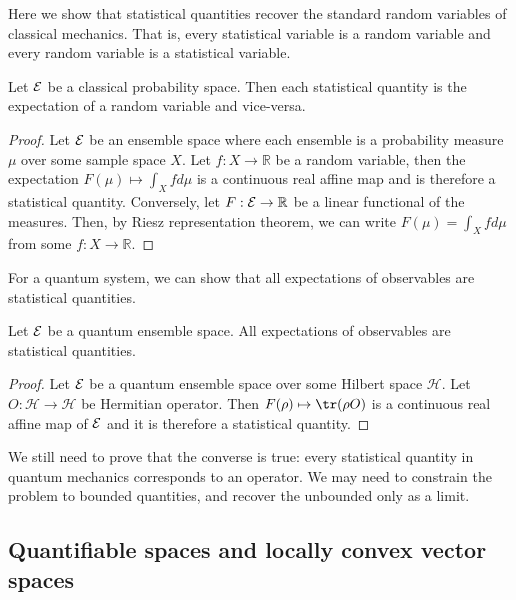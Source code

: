 Here we show that statistical quantities recover the standard random variables of classical mechanics. That is, every statistical variable is a random variable and every random variable is a statistical variable.

\begin{mathSection}
\begin{prop}
	Let $\mathcal{E}$ be a classical probability space. Then each statistical quantity is the expectation of a random variable and vice-versa.
\end{prop}

\begin{proof}
	Let $\mathcal{E}$ be an ensemble space where each ensemble is a probability measure $\mu$ over some sample space $X$. Let $f : X \to \mathbb{R}$ be a random variable, then the expectation $F(\mu) \mapsto \int_{X} f d\mu$ is a continuous real affine map and is therefore a statistical quantity. Conversely, let $F : \mathcal{E} \to \mathbb{R}$ be a linear functional of the measures. Then, by Riesz representation theorem, we can write $F(\mu) = \int_{X} f d\mu$ from some $f : X \to \mathbb{R}$.
\end{proof}
\end{mathSection}

For a quantum system, we can show that all expectations of observables are statistical quantities.

\begin{mathSection}
\begin{prop}
	Let $\mathcal{E}$ be a quantum ensemble space. All expectations of observables are statistical quantities.
\end{prop}

\begin{proof}
	Let $\mathcal{E}$ be a quantum ensemble space over some Hilbert space $\mathcal{H}$. Let $O : \mathcal{H} \to \mathcal{H}$ be Hermitian operator. Then $F(\rho) \mapsto \tr(\rho O)$ is a continuous real affine map of $\mathcal{E}$ and it is therefore a statistical quantity.
\end{proof}

\begin{remark}
	We still need to prove that the converse is true: every statistical quantity in quantum mechanics corresponds to an operator. We may need to constrain the problem to bounded quantities, and recover the unbounded only as a limit.
\end{remark}
\end{mathSection}


\subsection{Quantifiable spaces and locally convex vector spaces}

